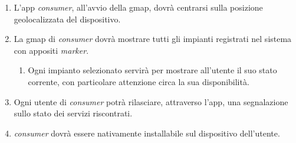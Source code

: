 \documentclass[12pt]{article}
\begin{document}
\begin{enumerate}
\item L'app \textit{consumer}, all'avvio della gmap, dovrà centrarsi sulla posizione geolocalizzata del dispositivo.
\item La gmap di \textit{consumer} dovrà mostrare tutti gli impianti registrati nel sistema con appositi \textit{marker}.
\begin{enumerate}
\item Ogni impianto selezionato servirà per mostrare all'utente il suo stato corrente, con particolare attenzione circa la sua disponibilità.
\end{enumerate}
\item Ogni utente di \textit{consumer} potrà rilasciare, attraverso l'app, una segnalazione sullo stato dei servizi riscontrati.
\item \textit{consumer} dovrà essere nativamente installabile sul dispositivo dell'utente.
\end{enumerate}
\end{document}
